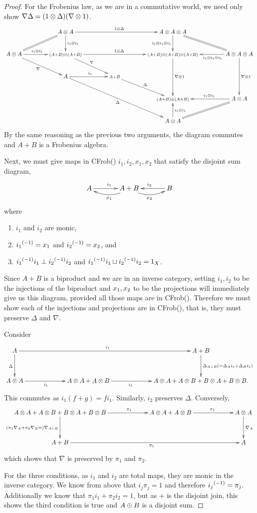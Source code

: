 \begin{proof}
  For the Frobenius law, as we are in a commutative world, we need only show
  $\nabla \Delta = (1\otimes\Delta)(\nabla\otimes1)$.
  \[
  \xymatrix@C+17pt{
      &A\*A \ar@{=}[ld] \ar[rr]^{1\*\Delta} \ar[d]^{i_1\*i_1} && A\*A\*A  \ar[d]_{i_1\*i_1\*i_1} \ar@{=}[dr] \\
      A\*A \ar[r]^(.45){i_1\*i_1}  \ar[dr]_{\nabla}
         &\scriptstyle{(A+B)\*(A+B)} \ar[rr]^{1\*\Delta} \ar[dr]^{\nabla}
         &&\scriptstyle{(A+B)\*(A+B)\*(A+B)}  \ar[dd]^{\nabla\*1} & A\*A\*A  \ar[l]^(.4){i_1\*i_1\*i_1}  \ar[dd]^{\nabla\*1}\\
     & A \ar[r]^{i_1} \ar[ddrr]_{\Delta} & \scriptstyle{A+B} \ar[dr]^{\Delta} \\
     & & & \scriptstyle{(A+B)\*(A+B)} & A\*A  \ar[l]_(.45){i_1\*i_1} \ar@{=}[dl]\\
     & & & A\*A \ar[u]_{i_1\*i_1}
    }
  \]
  By the same reasoning as the previous two arguments, the diagram commutes and $A+B$ is a Frobenius
  algebra.

  Next, we must give maps in CFrob(\X) $i_1,i_2,x_1,x_2$ that satisfy the disjoint sum diagram,
  \[
    \xymatrix@C+10pt{
      A\ar[r]^{i_1} &A+B\ar@/^9pt/[l]^{x_1} \ar@/_9pt/[r]_{x_2} & B \ar[l]_{i_2}
    }
  \]
  where
  \begin{enumerate}[{(}i{)}]
    \item $i_1$ and $i_2$ are monic,
    \item ${i_1}^{(-1)} = x_1$ and ${i_2}^{(-1)} = x_2$, and
    \item ${i_1}^{(-1)}i_1 \perp {i_2}^{(-1)}i_2$ and ${i_1}^{(-1)}i_1 \sqcup {i_2}^{(-1)}i_2 = 1_X$.
  \end{enumerate}

  Since $A+B$ is a biproduct and we are in an inverse category, setting $i_1,i_2$ to be the
  injections of the biproduct and $x_1,x_2$ to be the projections will immediately give us this
  diagram, provided all those maps are in CFrob(\X). Therefore we must show each of the injections
  and projections are in CFrob(\X), that is, they must preserve $\Delta$ and $\nabla$.

  Consider
  \[
     \xymatrix@C+40pt@R+10pt{
       A \ar[d]_{\Delta} \ar[rr]^{i_1} & &A+B \ar[d]^{\Delta_{A+B}(=\Delta_A i_1 + \Delta_B i_1)}\\
       A\*A \ar[r]_(.425){i_1} &A\*A+A\*B \ar[r]_(.375){i_1} & A\*A+A\*B+B\*A+B\*B.
     }
  \]
  This commutes as $i_1(f+g) = fi_1$. Similarly, $i_2$ preserves $\Delta$.
  Conversely,
  \[
    \xymatrix@C+40pt@R+10pt{
       {A\*A+A\*B+B\*A+B\*B}  \ar[d]_{(\pi_1\nabla_A + \pi_2\nabla_B=)\nabla_{A+B}} \ar[r]^(.625){\pi_1}
         &A\*A+A\*B \ar[r]^(.575){\pi_1} &A\*A\ar[d]^{\nabla_A}\\
       A+B \ar[rr]_{\pi_1}& & A
    }
  \]
  which shows that $\nabla$ is preserved by $\pi_1$ and $\pi_2$.

  For the three conditions, as $i_1$ and $i_2$ are total maps, they are monic in the inverse
  category. We know from above that $i_j\pi_j = 1$ and therefore ${i_j}^{(-1)} = \pi_j$. Additionally
  we know that $\pi_1i_1 + \pi_2i_2 = 1$, but as $+$ is the disjoint join, this shows the third
  condition is true and $A\oplus B$ is a disjoint sum.
\end{proof}


